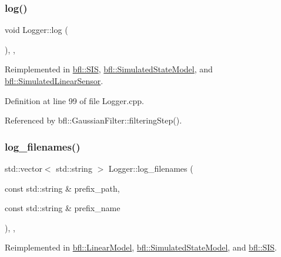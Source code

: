 \subsubsection{\texorpdfstring{log()}{log()}}
{\footnotesize\ttfamily void Logger\+::log (\begin{DoxyParamCaption}{ }\end{DoxyParamCaption})\hspace{0.3cm}{\ttfamily [protected]}, {\ttfamily [virtual]}, {\ttfamily [inherited]}}



Reimplemented in \mbox{\hyperlink{classbfl_1_1SIS_aeb0b87af1cc1fc4b616989ef489ecccc}{bfl\+::\+S\+IS}}, \mbox{\hyperlink{classbfl_1_1SimulatedStateModel_aa022eb0d50d898ffcc831af2907265b2}{bfl\+::\+Simulated\+State\+Model}}, and \mbox{\hyperlink{classbfl_1_1SimulatedLinearSensor_ab75bbe744d8516c97dfc90ad499b10e6}{bfl\+::\+Simulated\+Linear\+Sensor}}.



Definition at line 99 of file Logger.\+cpp.



Referenced by bfl\+::\+Gaussian\+Filter\+::filtering\+Step().

\mbox{\label{classbfl_1_1Logger_a328ceaa8e70e6918f11142b12b8be217}} 
\subsubsection{\texorpdfstring{log\+\_\+filenames()}{log\_filenames()}}
{\footnotesize\ttfamily std\+::vector$<$ std\+::string $>$ Logger\+::log\+\_\+filenames (\begin{DoxyParamCaption}\item[{const std\+::string \&}]{prefix\+\_\+path,  }\item[{const std\+::string \&}]{prefix\+\_\+name }\end{DoxyParamCaption})\hspace{0.3cm}{\ttfamily [protected]}, {\ttfamily [virtual]}, {\ttfamily [inherited]}}



Reimplemented in \mbox{\hyperlink{classbfl_1_1LinearModel_a8b8f645a7b7d8ebbb02c8958428fcf10}{bfl\+::\+Linear\+Model}}, \mbox{\hyperlink{classbfl_1_1SimulatedStateModel_ab4212871b8ca425855ec351c13dc3052}{bfl\+::\+Simulated\+State\+Model}}, and \mbox{\hyperlink{classbfl_1_1SIS_a805aef60946bfcaae4f65473dc7bd5ae}{bfl\+::\+S\+IS}}.



